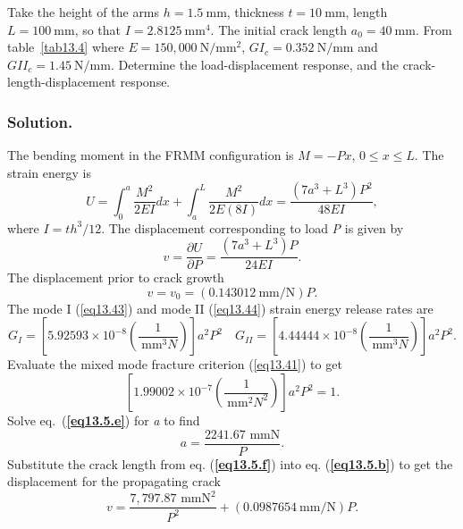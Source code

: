 \documentclass{AeroStructure-ERJohnson}
\begin{document}
\begin{example}\label{ex13.5}Take the height of the arms $h=1.5 \mathrm{~mm}$, thickness $t=10 \mathrm{~mm}$, length $L=100 \mathrm{~mm}$, so that $I=2.8125 \mathrm{~mm}^{4}$. The initial crack length $a_{0}=40 \mathrm{~mm}$. From table~\ref{tab13.4} where $E=150{,}000 \mathrm{~N} / \mathrm{mm}^{2}$, $G I_{c}=0.352 \mathrm{~N} / \mathrm{mm}$ and $G I I_{c}=1.45 \mathrm{~N} / \mathrm{mm}$. Determine the load-displacement response, and the crack-length-displacement response.

\subsubsection{Solution.} The bending moment in the FRMM configuration is $M=-P x$, $0 \leq x \leq L$. The strain energy is
\begin{equation}
U=\int_{0}^{a} \frac{M^{2}}{2 E I} d x+\int_{a}^{L} \frac{M^{2}}{2 E(8 I)} d x=\frac{\left(7 a^{3}+L^{3}\right) P^{2}}{48 E I}, \label{eq13.5.a}\tag{a}
\end{equation}
where $I=t h^{3} / 12$. The displacement corresponding to load \textit{P} is given by
\begin{equation}
v=\frac{\partial U}{\partial P}=\frac{(7 a^{3}+L^{3})P}{24 E I}. \label{eq13.5.b}\tag{b}
\end{equation}
The displacement prior to crack growth
\begin{equation}
v=v_{0}=(0.143012 \mathrm{~mm} / \mathrm{N}) P. \label{eq13.5.c}\tag{c}
\end{equation}
The mode I (\ref{eq13.43}) and mode II (\ref{eq13.44}) strain energy release rates are
\begin{equation}
G_{I}=\left[5.92593 \times 10^{-8}\left(\frac{1}{\mathrm{~mm}^{3} N}\right)\right] a^{2} P^{2} \quad G_{I I}=\left[4.44444 \times 10^{-8}\left(\frac{1}{\mathrm{~mm}^{3} N}\right)\right] a^{2} P^{2}. \label{eq13.5.d}\tag{d}
\end{equation}
Evaluate the mixed mode fracture criterion (\ref{eq13.41}) to get
\begin{equation}
\left[1.99002 \times 10^{-7}\left(\frac{1}{\mathrm{~mm}^{2} N^{2}}\right)\right] a^{2} P^{2}=1. \label{eq13.5.e}\tag{e}
\end{equation}
Solve eq.~(\textbf{\ref{eq13.5.e}}) for \textit{a} to find
\begin{equation}
a=\frac{2241.67 \textrm{ mmN}}{P}. \label{eq13.5.f}\tag{f}
\end{equation}
Substitute the crack length from eq. (\textbf{\ref{eq13.5.f}}) into eq. (\textbf{\ref{eq13.5.b}}) to get the displacement for the propagating crack
\begin{equation}
v=\frac{7{,}797.87 \textrm{ mmN}^{2}}{P^{2}}+(0.0987654 \mathrm{~mm} / \mathrm{N}) P. \label{eq13.5.g}\tag{g}
\end{equation}
\vspace*{2pt}\vspace*{-8pt}
\pagebreak


\end{example}
\end{document}
